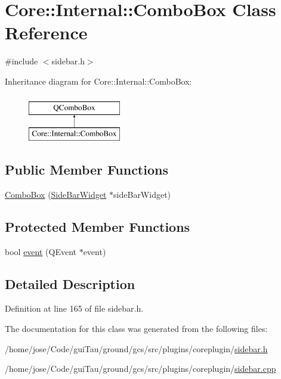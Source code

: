 \hypertarget{class_core_1_1_internal_1_1_combo_box}{\section{Core\-:\-:Internal\-:\-:Combo\-Box Class Reference}
\label{class_core_1_1_internal_1_1_combo_box}
}


{\ttfamily \#include $<$sidebar.\-h$>$}

Inheritance diagram for Core\-:\-:Internal\-:\-:Combo\-Box\-:\begin{figure}[H]
\begin{center}
\leavevmode
\includegraphics[height=2.000000cm]{class_core_1_1_internal_1_1_combo_box}
\end{center}
\end{figure}
\subsection*{Public Member Functions}
\begin{DoxyCompactItemize}
\item 
\hyperlink{group___core_plugin_gaa41267baec16385b8d7659ec5aadbedb}{Combo\-Box} (\hyperlink{class_core_1_1_internal_1_1_side_bar_widget}{Side\-Bar\-Widget} $\ast$side\-Bar\-Widget)
\end{DoxyCompactItemize}
\subsection*{Protected Member Functions}
\begin{DoxyCompactItemize}
\item 
bool \hyperlink{group___core_plugin_ga01c032ab5193ddd6ab96894f35f7acb8}{event} (Q\-Event $\ast$event)
\end{DoxyCompactItemize}


\subsection{Detailed Description}


Definition at line 165 of file sidebar.\-h.



The documentation for this class was generated from the following files\-:\begin{DoxyCompactItemize}
\item 
/home/jose/\-Code/gui\-Tau/ground/gcs/src/plugins/coreplugin/\hyperlink{sidebar_8h}{sidebar.\-h}\item 
/home/jose/\-Code/gui\-Tau/ground/gcs/src/plugins/coreplugin/\hyperlink{sidebar_8cpp}{sidebar.\-cpp}\end{DoxyCompactItemize}
